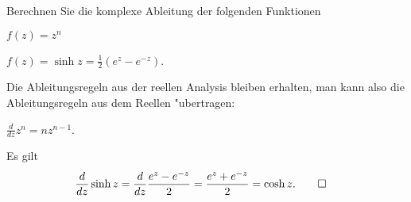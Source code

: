 Berechnen Sie die komplexe Ableitung der folgenden Funktionen
\begin{teilaufgaben}
\item $f(z)=z^n$
\item $f(z)=\operatorname{sinh}z=\frac12(e^z-e^{-z})$.
\end{teilaufgaben}

\begin{loesung}
Die Ableitungsregeln aus der reellen Analysis bleiben erhalten,
man kann also die Ableitungsregeln aus dem Reellen "ubertragen:
\begin{teilaufgaben}
\item $\displaystyle\frac{d}{dz}z^n=nz^{n-1}$.
\item Es gilt
\begin{align*}
\frac{d}{dz}\operatorname{sinh}z
&=
\frac{d}{dz}\frac{e^z-e^{-z}}2
=
\frac{e^z+e^{-z}}2=\operatorname{cosh}z.
\qedhere
\end{align*}
\end{teilaufgaben}
\end{loesung}

